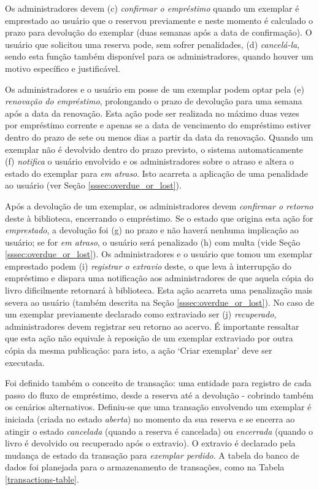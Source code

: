 \documentclass[a4paper]{article}
\begin{document}
Os administradores devem (c) \textit{confirmar o empréstimo} quando um exemplar é emprestado ao usuário que o reservou previamente e neste momento é calculado o prazo para devolução do exemplar (duas semanas após a data de confirmação). O usuário que solicitou uma reserva pode, sem sofrer penalidades, (d) \textit{cancelá-la}, sendo esta função também disponível para os administradores, quando houver um motivo específico e justificável.

Os administradores e o usuário em posse de um exemplar podem optar pela (e) \textit{renovação do empréstimo}, prolongando o prazo de devolução para uma semana após a data da renovação. Esta ação pode ser realizada no máximo duas vezes por empréstimo corrente e apenas se a data de vencimento do empréstimo estiver dentro do prazo de sete ou menos dias a partir da data da renovação. Quando um exemplar não é devolvido dentro do prazo previsto, o sistema automaticamente (f) \textit{notifica} o usuário envolvido e os administradores sobre o atraso e altera o estado do exemplar para \textit{em atraso}. Isto acarreta a aplicação de uma penalidade ao usuário (ver Seção \ref{sssec:overdue_or_lost}).

Após a devolução de um exemplar, os administradores devem \textit{confirmar o retorno} deste à biblioteca, encerrando o empréstimo. Se o estado que origina esta ação for \textit{emprestado}, a devolução foi (g) no prazo e não haverá nenhuma implicação ao usuário; se for \textit{em atraso}, o usuário será penalizado (h) com multa (vide Seção \ref{sssec:overdue_or_lost}). Os administradores e o usuário que tomou um exemplar emprestado podem (i) \textit{registrar o extravio} deste, o que leva à interrupção do empréstimo e dispara uma notificação aos administradores de que aquela cópia do livro dificilmente retornará à biblioteca. Esta ação acarreta uma penalização mais severa ao usuário (também descrita na Seção \ref{sssec:overdue_or_lost}). No caso de um exemplar previamente declarado como extraviado ser (j) \textit{recuperado}, administradores devem registrar seu retorno ao acervo. É importante ressaltar que esta ação não equivale à reposição de um exemplar extraviado por outra cópia da mesma publicação: para isto, a ação ‘Criar exemplar’ deve ser executada.

Foi definido também o conceito de transação: uma entidade para registro de cada passo do fluxo de empréstimo, desde a reserva até a devolução - cobrindo também os cenários alternativos. Definiu-se que uma transação envolvendo um exemplar é iniciada (criada no estado \textit{aberta}) no momento da sua reserva e se encerra ao atingir o estado \textit{cancelada} (quando a reserva é cancelada) ou \textit{encerrada} (quando o livro é devolvido ou recuperado após o extravio). O extravio é declarado pela mudança de estado da transação para \textit{exemplar perdido}. A tabela do banco de dados foi planejada para o armazenamento de transações, como na Tabela \ref{transactions-table}.
\end{document}

